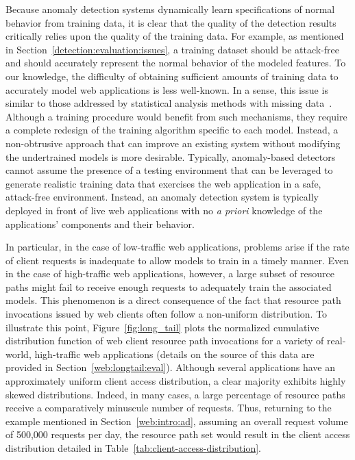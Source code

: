 Because anomaly detection systems dynamically learn specifications of
normal behavior from training data, it is clear that the quality of
the detection results critically relies upon the quality of the
training data. For example, as mentioned in
Section~\ref{detection:evaluation:issues}, a training dataset should
be attack-free and should accurately represent the normal behavior of
the modeled features. To our knowledge, the difficulty of obtaining
sufficient amounts of training data to accurately model web
applications is less well-known. In a sense, this issue is similar to
those addressed by statistical analysis methods with missing
data~\citep{little1987statistical}. Although a training procedure would
benefit from such mechanisms, they require a complete redesign of the
training algorithm specific to each model. Instead, a non-obtrusive
approach that can improve an existing system without modifying the
undertrained models is more desirable.  Typically, anomaly-based
detectors cannot assume the presence of a testing environment that can
be leveraged to generate realistic training data that exercises the
web application in a safe, attack-free environment. Instead, an
anomaly detection system is typically deployed in front of live web
applications with no \emph{a priori} knowledge of the applications'
components and their behavior.

In particular, in the case of low-traffic web applications, problems
arise if the rate of client requests is inadequate to allow models to
train in a timely manner. Even in the case of high-traffic web
applications, however, a large subset of resource paths might fail to
receive enough requests to adequately train the associated models.
This phenomenon is a direct consequence of the fact that resource path
invocations issued by web clients often follow a non-uniform
distribution.  To illustrate this point, Figure~\ref{fig:long_tail}
plots the normalized cumulative distribution function of web client
resource path invocations for a variety of real-world, high-traffic
web applications (details on the source of this data are provided in
Section~\ref{web:longtail:eval}). Although several applications have
an approximately uniform client access distribution, a clear majority
exhibits highly skewed distributions.  Indeed, in many cases, a large
percentage of resource paths receive a comparatively minuscule number
of requests. Thus, returning to the example mentioned in
Section~\ref{web:intro:ad}, assuming an overall request volume of
500,000 requests per day, the resource path set would result in the
client access distribution detailed in
Table~\ref{tab:client-access-distribution}.

